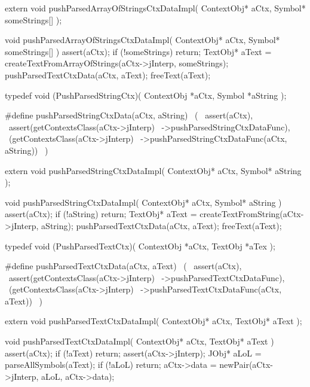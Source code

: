 \startCHeader
extern void pushParsedArrayOfStringsCtxDataImpl(
  ContextObj* aCtx,
  Symbol* someStrings[]
);
\stopCHeader
{}

\startCCode
void pushParsedArrayOfStringsCtxDataImpl(
  ContextObj* aCtx,
  Symbol* someStrings[]
) {
  assert(aCtx);
  if (!someStrings) return;
  TextObj* aText =
    createTextFromArrayOfStrings(aCtx->jInterp, someStrings);
  pushParsedTextCtxData(aCtx, aText);
  freeText(aText);
}
\stopCCode

\startCHeader
typedef void (PushParsedStringCtx)(
  ContextObj *aCtx,
  Symbol     *aString
);

#define pushParsedStringCtxData(aCtx, aString)      \
  (                                                 \
    assert(aCtx),                                   \
    assert(getContextsClass(aCtx->jInterp)          \
      ->pushParsedStringCtxDataFunc),               \
    (getContextsClass(aCtx->jInterp)                \
      ->pushParsedStringCtxDataFunc(aCtx, aString)) \
  )
\stopCHeader

\setCHeaderStream{private}
\startCHeader
extern void pushParsedStringCtxDataImpl(
  ContextObj* aCtx,
  Symbol* aString
);
\stopCHeader
\setCHeaderStream{public}

\startCCode
void pushParsedStringCtxDataImpl(
  ContextObj* aCtx,
  Symbol* aString
) {
  assert(aCtx);
  if (!aString) return;
  TextObj* aText =
    createTextFromString(aCtx->jInterp, aString);
  pushParsedTextCtxData(aCtx, aText);
  freeText(aText);
}
\stopCCode

\startCHeader
typedef void (PushParsedTextCtx)(
  ContextObj *aCtx,
  TextObj    *aTex
);

#define pushParsedTextCtxData(aCtx, aText)      \
  (                                             \
    assert(aCtx),                               \
    assert(getContextsClass(aCtx->jInterp)      \
      ->pushParsedTextCtxDataFunc),             \
    (getContextsClass(aCtx->jInterp)            \
      ->pushParsedTextCtxDataFunc(aCtx, aText)) \
  )
\stopCHeader

\startCHeader
extern void pushParsedTextCtxDataImpl(
  ContextObj* aCtx,
  TextObj* aText
);
\stopCHeader
\setCHeaderStream{public}

\startCCode
void pushParsedTextCtxDataImpl(
  ContextObj* aCtx,
  TextObj* aText
) {
  assert(aCtx);
  if (!aText) return;
  assert(aCtx->jInterp);
  JObj* aLoL = parseAllSymbols(aText);
  if (!aLoL) return;
  aCtx->data = newPair(aCtx->jInterp, aLoL, aCtx->data);
}
\stopCCode

